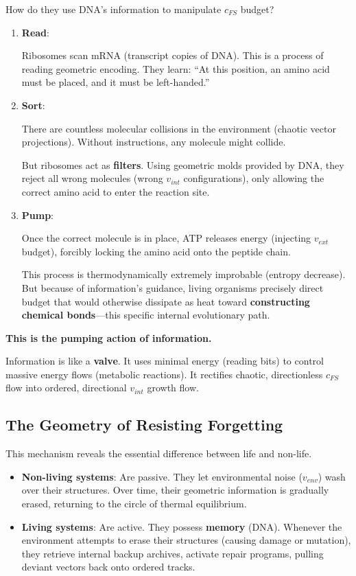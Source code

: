 How do they use DNA's information to manipulate $c_{FS}$ budget?

\begin{enumerate}
\item \textbf{Read}:

    Ribosomes scan mRNA (transcript copies of DNA). This is a process of reading geometric encoding. They learn: ``At this position, an amino acid must be placed, and it must be left-handed.''

\item \textbf{Sort}:

    There are countless molecular collisions in the environment (chaotic vector projections). Without instructions, any molecule might collide.

    But ribosomes act as \textbf{filters}. Using geometric molds provided by DNA, they reject all wrong molecules (wrong $v_{int}$ configurations), only allowing the correct amino acid to enter the reaction site.

\item \textbf{Pump}:

    Once the correct molecule is in place, ATP releases energy (injecting $v_{ext}$ budget), forcibly locking the amino acid onto the peptide chain.

    This process is thermodynamically extremely improbable (entropy decrease). But because of information's guidance, living organisms precisely direct budget that would otherwise dissipate as heat toward \textbf{constructing chemical bonds}---this specific internal evolutionary path.
\end{enumerate}

\textbf{This is the pumping action of information.}

Information is like a \textbf{valve}. It uses minimal energy (reading bits) to control massive energy flows (metabolic reactions). It rectifies chaotic, directionless $c_{FS}$ flow into ordered, directional $v_{int}$ growth flow.

\subsection{The Geometry of Resisting Forgetting}

This mechanism reveals the essential difference between life and non-life.

\begin{itemize}
\item \textbf{Non-living systems}: Are passive. They let environmental noise ($v_{env}$) wash over their structures. Over time, their geometric information is gradually erased, returning to the circle of thermal equilibrium.

\item \textbf{Living systems}: Are active. They possess \textbf{memory} (DNA). Whenever the environment attempts to erase their structures (causing damage or mutation), they retrieve internal backup archives, activate repair programs, pulling deviant vectors back onto ordered tracks.
\end{itemize}

